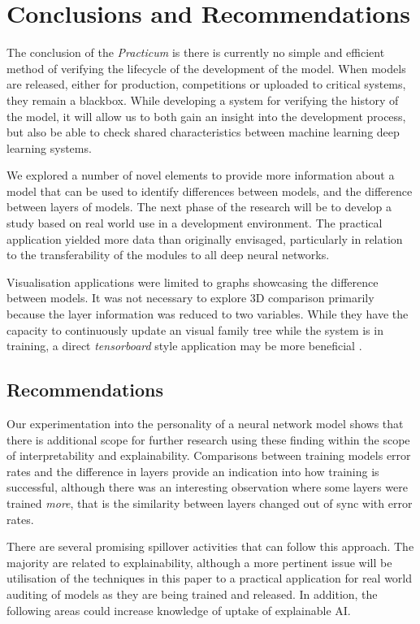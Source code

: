 \section{Conclusions and Recommendations}

The conclusion of the \textit{Practicum} is there is currently no simple and efficient method of verifying the lifecycle of the development of the model. When models are released, either for production, competitions or uploaded to critical systems, they remain a blackbox. While developing a system for verifying the history of the model, it will allow us to both gain an insight into the development process, but also be able to check shared characteristics between machine learning deep learning systems.

We explored a number of novel elements to provide more information about a model that can be used to identify differences between models, and the difference between layers of models. The next phase of the research will be to develop a study based on real world use in a development environment. The practical application yielded more data than originally envisaged, particularly in relation to the transferability of the modules to all deep neural networks.

Visualisation applications were limited to graphs showcasing the difference between models. It was not necessary to explore 3D comparison primarily because the layer information was reduced to two variables. While they have the capacity to continuously update an visual family tree while the system is in training, a direct \textit{tensorboard} style application may be more beneficial .

\subsection{Recommendations}


Our experimentation into the personality of a neural network model shows that there is additional scope for further research using these finding within the scope of interpretability and explainability. Comparisons between training models error rates and the difference in layers provide an indication into how training is successful, although there was an interesting observation where some layers were trained \textit{more}, that is the similarity between layers changed out of sync with error rates.

There are several promising spillover activities that can follow this approach. The majority are related to explainability, although a more pertinent issue will be utilisation of the techniques in this paper to a practical application for real world auditing of models as they are being trained and released. In addition, the following areas could increase knowledge of uptake of explainable AI.

